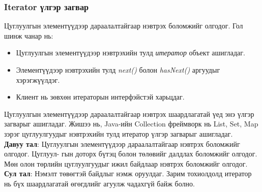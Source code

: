 
\subsubsection{Iterator үлгэр загвар}
\quad \quad Цуглуулгын элементүүдээр дараалалтайгаар нэвтрэх боломжийг олгодог. Гол шинж чанар нь:
\begin{itemize}
	\item Цуглуулгын элементүүдээр нэвтрэхийн тулд \textit{итератор} объект ашигладаг.
	\item Элементүүдээр нэвтрэхийн тулд \textit{next()} болон \textit{hasNext()} аргуудыг хэрэгжүүлдэг.
	\item Клиент нь зөвхөн итераторын интерфэйстэй харьцдаг.
\end{itemize}
Цуглуулгын элементүүдээр дараалалтайгаар нэвтрэх шаардлагатай үед энэ үлгэр загварыг ашигладаг. Жишээ нь, Java-ийн Collection фреймворк нь List, Set, Map зэрэг цуглуулгуудыг нэвтрэхийн тулд итератор үлгэр загварыг ашигладаг.\\
\textbf{Давуу тал}: Цуглуулгын элементүүдээр дараалалтайгаар нэвтрэх боломжийг олгодог. Цуглуул- гын доторх бүтэц болон төлөвийг далдлах боломжийг олгодог. Мөн олон төрлийн цуглуулгуудыг ижил байдлаар нэвтрэх боломжийг олгодог.\\
\textbf{Сул тал}: Нэмэлт төвөгтэй байдлыг нэмж оруулдаг. Зарим тохиолдолд итератор нь бүх шаардлагатай өгөгдлийг агуулж чадахгүй байж болно.